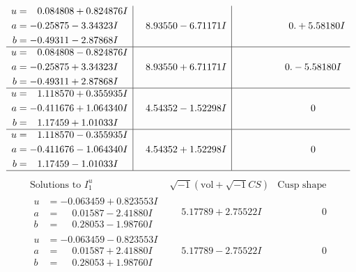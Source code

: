 \documentclass[1p]{elsarticle_modified}
\theoremstyle{definition}
\newcommand{\I}{\sqrt{-1}}
\begin{document}
$$\begin{array}{c|c|c}
\begin{aligned}
u &= \phantom{-}0.084808 + 0.824876 I \\
a &= -0.25875 - 3.34323 I \\
b &= -0.49311 - 2.87868 I\end{aligned}
 & \phantom{-}8.93550 - 6.71171 I & \phantom{-0.000000 -}0. + 5.58180 I \\ \hline\begin{aligned}
u &= \phantom{-}0.084808 - 0.824876 I \\
a &= -0.25875 + 3.34323 I \\
b &= -0.49311 + 2.87868 I\end{aligned}
 & \phantom{-}8.93550 + 6.71171 I & \phantom{-0.000000 } 0. - 5.58180 I \\ \hline\begin{aligned}
u &= \phantom{-}1.118570 + 0.355935 I \\
a &= -0.411676 + 1.064340 I \\
b &= \phantom{-}1.17459 + 1.01033 I\end{aligned}
 & \phantom{-}4.54352 - 1.52298 I & \phantom{-0.000000 } 0 \\ \hline\begin{aligned}
u &= \phantom{-}1.118570 - 0.355935 I \\
a &= -0.411676 - 1.064340 I \\
b &= \phantom{-}1.17459 - 1.01033 I\end{aligned}
 & \phantom{-}4.54352 + 1.52298 I & \phantom{-0.000000 } 0\\
 \hline 
 \end{array}$$\newpage$$\begin{array}{c|c|c}  
\text{Solutions to }I^u_{1}& \I (\text{vol} + \sqrt{-1}CS) & \text{Cusp shape}\\
 \hline 
\begin{aligned}
u &= -0.063459 + 0.823553 I \\
a &= \phantom{-}0.01587 - 2.41880 I \\
b &= \phantom{-}0.28053 - 1.98760 I\end{aligned}
 & \phantom{-}5.17789 + 2.75522 I & \phantom{-0.000000 } 0 \\ \hline\begin{aligned}
u &= -0.063459 - 0.823553 I \\
a &= \phantom{-}0.01587 + 2.41880 I \\
b &= \phantom{-}0.28053 + 1.98760 I\end{aligned}
 & \phantom{-}5.17789 - 2.75522 I & \phantom{-0.000000 } 0 \\ \hline\begin{aligned}

\end{aligned}
\end{array}$$
\end{document}
